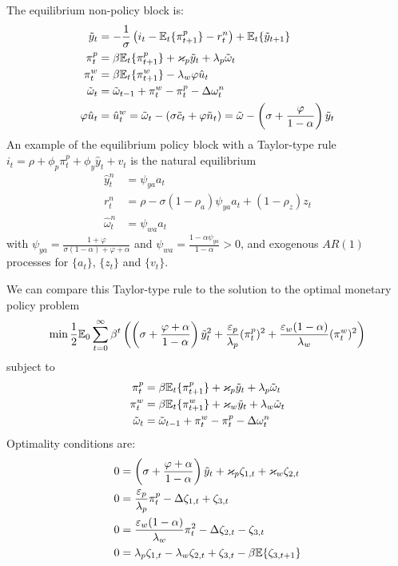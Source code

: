 \documentclass[10pt]{article}
\begin{document}
\begin{model}
	The equilibrium non-policy block is:
	\begin{align*}
		\tilde{y}_t &= -\frac{1}{\sigma}\left( i_t - \mathbb{E}_t\{\pi_{t+1}^p\} - r_t^n\right) + \mathbb{E}_t\{\tilde{y}_{t+1}\} \\
		\pi_t^p &= \beta \mathbb{E}_t\{\pi_{t+1}^p\} + \varkappa_p \tilde{y}_t + \lambda_p \tilde{\omega}_t \\
		\pi_t^w &= \beta \mathbb{E}_t\{\pi_{t+1}^w\} - \lambda_w \varphi \hat{u}_t \\
		\tilde{\omega}_t &= \tilde{\omega}_{t-1} + \pi_t^w - \pi_t^p - \Delta \omega_t^n \\ \varphi \hat{u}_t &= \hat{u}_t^w = \tilde{\omega}_t - (\sigma \tilde{c}_t + \varphi \tilde{n}_t) = \tilde{\omega} - \left( \sigma + \frac{\varphi}{1-\alpha}\right) \tilde{y}_t
	\end{align*}
	An example of the equilibrium policy block with a Taylor-type rule $i_t = \rho + \phi_p \pi^p_t + \phi_y \hat{y}_t + v_t$ is the natural equilibrium \begin{align*} \hat{y}_t^n &= \psi_{ya}a_t \\ r_t^n &= \rho - \sigma(1-\rho_a)\psi_{ya}a_t + (1-\rho_z)z_t \\ \hat{\omega}_t^n &= \psi_{wa}a_t\end{align*}with $\psi_{ya} = \frac{1+\varphi}{\sigma(1-\alpha)+\varphi+\alpha}$ and $\psi_{wa} = \frac{1-\alpha\psi_{ya}}{1-\alpha} > 0$, and exogenous $AR(1)$ processes for $\{a_t\}$, $\{z_t\}$ and $\{v_t\}$. 
	
	We can compare this Taylor-type rule to the solution to the optimal monetary policy problem \[\min \frac{1}{2}\mathbb{E}_0 \sum_{t=0}^\infty \beta^t \left( \left( \sigma + \frac{\varphi + \alpha}{1-\alpha} \right) \tilde{y}_t^2 + \frac{\varepsilon_p}{\lambda_p} (\pi_t^p)^2 + \frac{\varepsilon_w(1-\alpha)}{\lambda_w} (\pi_t^w)^2\right)\]subject to \begin{align*} \pi_t^p &= \beta \mathbb{E}_t\{\pi_{t+1}^p\} + \varkappa_p \tilde{y}_t + \lambda_p \tilde{\omega}_t \\ \pi_t^w &= \beta \mathbb{E}_t\{\pi_{t+1}^w\} + \varkappa_w \tilde{y}_t + \lambda_w \tilde{\omega}_t  \\ \tilde{\omega}_t &= \tilde{\omega}_{t-1} + \pi_t^w - \pi_t^p - \Delta \omega_t^n\end{align*}Optimality conditions are:
	\begin{align*}
		0 &= \left( \sigma + \frac{\varphi + \alpha}{1-\alpha}\right) \tilde{y}_t + \varkappa_p \zeta_{1,t} + \varkappa_w \zeta_{2,t} \\ 
		0 &= \frac{\varepsilon_p}{\lambda_p} \pi_t^p - \Delta \zeta_{1,t} + \zeta_{3,t} \\
		0 &= \frac{\varepsilon_w(1-\alpha)}{\lambda_w}\pi_t^2 - \Delta \zeta_{2,t} - \zeta_{3,t} \\
		0 &= \lambda_p \zeta_{1,t} - \lambda_w \zeta_{2,t} + \zeta_{3,t} - \beta \mathbb{E} \{\zeta_{3,t+1}\}
	\end{align*}
	

\end{model}
\end{document}
